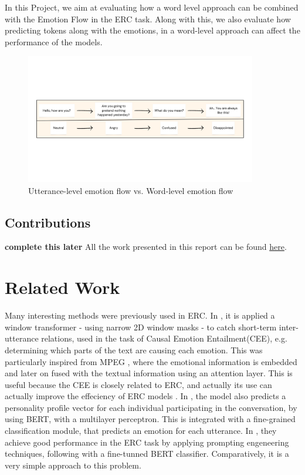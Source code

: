 \documentclass[oneside, a4paper, onecolumn, 11pt]{article}
\begin{document}
In this Project, we aim at evaluating how a word level approach can be combined with the Emotion Flow in the ERC task. Along with this, we also evaluate 
how predicting tokens along with the emotions, in a word-level approach can affect the performance of the models.

\begin{figure}[ht]
  \begin{center}
    \includegraphics[width=0.9\textwidth]{img/dialogue_example/emotion_flow}
    \caption{Utterance-level emotion flow vs. Word-level emotion flow}
  \end{center}
\end{figure}

\subsection{Contributions}
\textbf{complete this later}
All the work presented in this report can be found \href{https://github.com/bruno-iorio/thesis-work}{here}.


\section{Related Work} 
Many interesting methods were previously used in ERC. In \cite{LIU2025126924}, it is applied a window transformer - using narrow
2D window masks - to catch short-term inter-utterance relations, used in the task of Causal Emotion Entailment(CEE), e.g. determining
which parts of the text are causing each emotion. This was particularly inspired from MPEG \cite{10252019}, where the emotional information 
is embedded and later on fused with the textual information using an attention layer. This is useful because the CEE is closely related to ERC,
and actually its use can actually improve the effeciency of ERC models \cite{LIU2025126924}. In \cite{wang-etal-2024-emotion}, the model 
also predicts a personality profile vector for each individual participating in the conversation, by using BERT, with a multilayer perceptron.
This is integrated with a fine-grained classification  module, that predicts an emotion for each utterance. In \cite{qin2023bertercfinetuningbertemotion}, they achieve
good performance in the ERC task by applying prompting engeneering techniques, following with a fine-tunned BERT classifier. Comparatively, it 
is a very simple approach to this problem.
\end{document}
